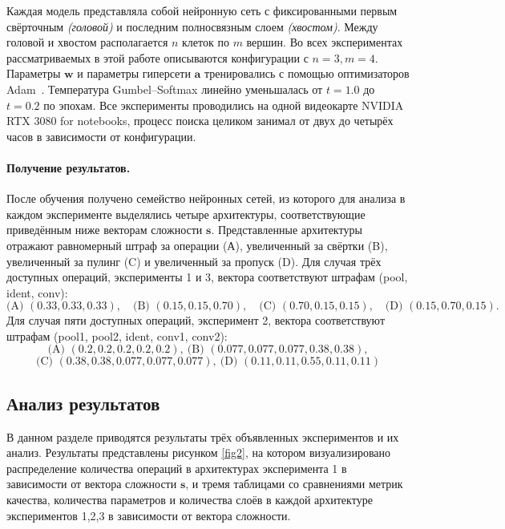\documentclass{article}
\begin{document}
Каждая модель представляла собой нейронную сеть с фиксированными первым свёрточным \textit{(головой)} и последним полносвязным слоем \textit{(хвостом)}. Между головой и хвостом располагается $n$ клеток по $m$ вершин. Во всех экспериментах рассматриваемых в этой работе описываются конфигурации с $n=3, m=4$. Параметры $\boldsymbol w$ и параметры гиперсети $\boldsymbol a$ тренировались с помощью оптимизаторов Adam~\cite{kingma2015adam}. Температура Gumbel–Softmax линейно уменьшалась от \(t{=}1.0\) до \(t{=}0.2\) по эпохам. Все эксперименты проводились на одной видеокарте NVIDIA RTX 3080 for notebooks, процесс поиска целиком занимал от двух до четырёх часов в зависимости от конфигурации.

\paragraph{Получение результатов.}
После обучения получено семейство нейронных сетей, из которого для анализа в каждом эксперименте выделялись четыре архитектуры, соответствующие приведённым ниже векторам сложности $\boldsymbol{s}$. Представленные архитектуры отражают равномерный штраф за операции (А), увеличенный за свёртки (B), увеличенный за пулинг (C) и увеличенный за пропуск (D). 
Для случая трёх доступных операций, эксперименты 1 и 3, вектора соответствуют штрафам (pool, ident, conv):
\[
\text{(A) } (0.33,0.33,0.33),\quad
\text{(B) } (0.15,0.15,0.70),\quad
\text{(C) } (0.70,0.15,0.15),\quad
\text{(D) } (0.15,0.70,0.15).
\]
Для случая пяти доступных операций, эксперимент 2, вектора соответствуют штрафам (pool1, pool2, ident, conv1, conv2):
\[
\text{(A) } (0.2,0.2,0.2,0.2,0.2),\ 
\text{(B) } (0.077, 0.077, 0.077, 0.38, 0.38),
\]
\[
\text{(C) } (0.38, 0.38, 0.077, 0.077, 0.077),\
\text{(D) } (0.11,0.11,0.55,0.11,0.11)
\]


\subsection{Анализ результатов}

В данном разделе приводятся результаты трёх объявленных экспериментов и их анализ. Результаты представлены рисунком \ref{fig2}, на котором визуализировано распределение количества операций в архитектурах эксперимента 1 в зависимости от вектора сложности $\boldsymbol s$, и тремя таблицами со сравнениями метрик качества, количества параметров и количества слоёв в каждой архитектуре экспериментов 1,2,3 в зависимости от вектора сложности. 
\end{document}
